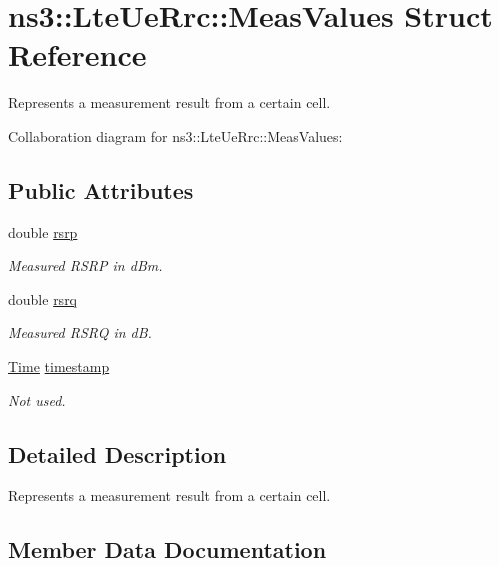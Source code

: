 \hypertarget{structns3_1_1LteUeRrc_1_1MeasValues}{}\section{ns3\+:\+:Lte\+Ue\+Rrc\+:\+:Meas\+Values Struct Reference}
\label{structns3_1_1LteUeRrc_1_1MeasValues}


Represents a measurement result from a certain cell.  




Collaboration diagram for ns3\+:\+:Lte\+Ue\+Rrc\+:\+:Meas\+Values\+:
\subsection*{Public Attributes}
\begin{DoxyCompactItemize}
\item 
double \hyperlink{structns3_1_1LteUeRrc_1_1MeasValues_a4ef2eff7d2e96bb12849911b442531b1}{rsrp}
\begin{DoxyCompactList}\small\item\em Measured R\+S\+RP in d\+Bm. \end{DoxyCompactList}\item 
double \hyperlink{structns3_1_1LteUeRrc_1_1MeasValues_ae959ce8b2053f9a594372d8ea8deb712}{rsrq}
\begin{DoxyCompactList}\small\item\em Measured R\+S\+RQ in dB. \end{DoxyCompactList}\item 
\hyperlink{classns3_1_1Time}{Time} \hyperlink{structns3_1_1LteUeRrc_1_1MeasValues_acf9ca07effa6ebcfa8a16fd0df1e35d7}{timestamp}
\begin{DoxyCompactList}\small\item\em Not used. \end{DoxyCompactList}\end{DoxyCompactItemize}


\subsection{Detailed Description}
Represents a measurement result from a certain cell. 

\subsection{Member Data Documentation}
